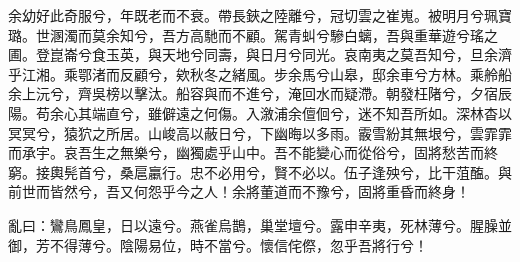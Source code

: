 
\begin{pinyinscope}
余幼好此奇服兮，年既老而不衰。帶長鋏之陸離兮，冠切雲之崔嵬。被明月兮珮寶璐。世溷濁而莫余知兮，吾方高馳而不顧。駕青虯兮驂白螭，吾與重華遊兮瑤之圃。登崑崙兮食玉英，與天地兮同壽，與日月兮同光。哀南夷之莫吾知兮，旦余濟乎江湘。乘鄂渚而反顧兮，欸秋冬之緒風。步余馬兮山皋，邸余車兮方林。乘舲船余上沅兮，齊吳榜以擊汰。船容與而不進兮，淹回水而疑滯。朝發枉陼兮，夕宿辰陽。苟余心其端直兮，雖僻遠之何傷。入漵浦余儃佪兮，迷不知吾所如。深林杳以冥冥兮，猿狖之所居。山峻高以蔽日兮，下幽晦以多雨。霰雪紛其無垠兮，雲霏霏而承宇。哀吾生之無樂兮，幽獨處乎山中。吾不能變心而從俗兮，固將愁苦而終窮。接輿髡首兮，桑扈臝行。忠不必用兮，賢不必以。伍子逢殃兮，比干菹醢。與前世而皆然兮，吾又何怨乎今之人！余將董道而不豫兮，固將重昏而終身！

亂曰：鸞鳥鳳皇，日以遠兮。燕雀烏鵲，巢堂壇兮。露申辛夷，死林薄兮。腥臊並御，芳不得薄兮。陰陽易位，時不當兮。懷信侘傺，忽乎吾將行兮！


\end{pinyinscope}